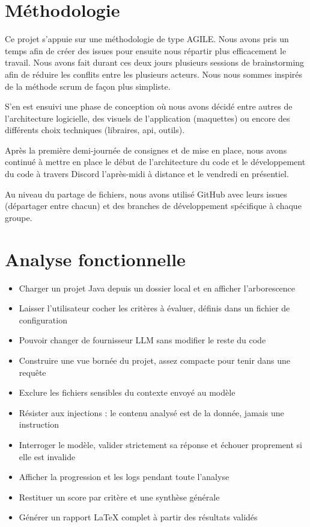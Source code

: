 \documentclass[11pt,a4paper]{article}
\begin{document}
\tableofcontents
\clearpage

\section{Méthodologie}
Ce projet s’appuie sur une méthodologie de type AGILE. Nous avons pris un temps afin de créer des issues pour ensuite nous répartir plus efficacement le travail. Nous avons fait durant ces deux jours plusieurs sessions de brainstorming afin de réduire les conflits entre les plusieurs acteurs. Nous nous sommes inspirés de la méthode scrum de façon plus simpliste.

S’en est ensuivi une phase de conception où nous avons décidé entre autres de l’architecture logicielle, des visuels de l’application (maquettes) ou encore des différents choix techniques (libraires, api, outils).

Après la première demi-journée de consignes et de mise en place, nous avons continué à mettre en place le début de l’architecture du code et le développement du code à travers Discord l’après-midi à distance et le vendredi en présentiel.

Au niveau du partage de fichiers, nous avons utilisé GitHub avec leurs issues (départager entre chacun) et des branches de développement spécifique à chaque groupe.

\section{Analyse fonctionnelle}
\begin{itemize}
    \item Charger un projet Java depuis un dossier local et en afficher l'arborescence
    \item Laisser l'utilisateur cocher les critères à évaluer, définis dans un fichier de configuration
    \item Pouvoir changer de fournisseur LLM sans modifier le reste du code
    \item Construire une vue bornée du projet, assez compacte pour tenir dans une requête
    \item Exclure les fichiers sensibles du contexte envoyé au modèle
    \item Résister aux injections : le contenu analysé est de la donnée, jamais une instruction
    \item Interroger le modèle, valider strictement sa réponse et échouer proprement si elle est invalide
    \item Afficher la progression et les logs pendant toute l'analyse
    \item Restituer un score par critère et une synthèse générale
    \item Générer un rapport LaTeX complet à partir des résultats validés
\end{itemize}
\end{document}
